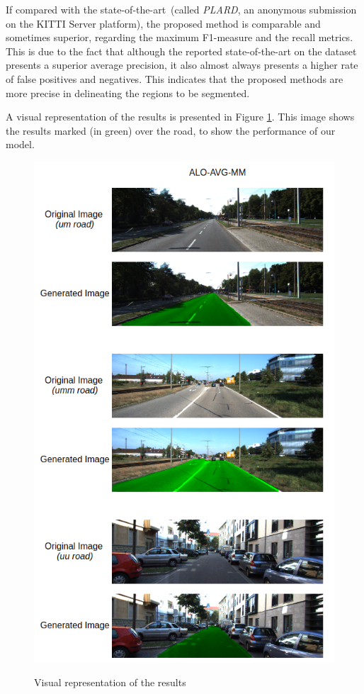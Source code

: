 If compared with the state-of-the-art~(called \textit{PLARD}, an anonymous submission on the KITTI Server platform), the proposed method is comparable and sometimes superior, regarding the maximum F1-measure and the recall metrics. This is due to the fact that although the reported state-of-the-art on the dataset presents a superior average precision, it also almost always presents a higher rate of false positives and negatives. This indicates that the proposed methods are more precise in delineating the regions to be segmented.



A visual representation of the results is presented in Figure \ref{fig:visual_representation}. This image shows the results marked (in green) over the road, to show the performance of our model.

\begin{figure}
  \caption{Visual representation of the results}
  \centering
  \includegraphics[width=1.\columnwidth]{figures/falreis/visual_representation.png}
  \label{fig:visual_representation}
\end{figure}
